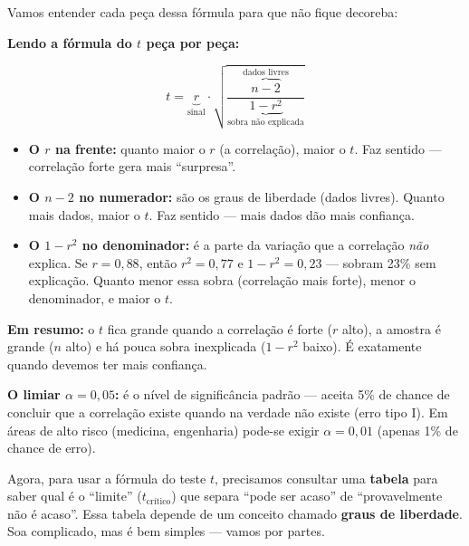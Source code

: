 Vamos entender cada peça dessa fórmula para que não fique decoreba:

\begin{SolvedBox}
\textbf{Lendo a fórmula do $t$ peça por peça:}

\[
t = \underbrace{r}_{\text{sinal}} \cdot
    \sqrt{\frac{\overbrace{n - 2}^{\text{dados livres}}}
               {\underbrace{1 - r^2}_{\text{sobra não explicada}}}}
\]

\begin{itemize}
  \item \textbf{O $r$ na frente:} quanto maior o $r$ (a correlação),
  maior o $t$. Faz sentido --- correlação forte gera mais ``surpresa''.
  \item \textbf{O $n - 2$ no numerador:} são os graus de liberdade
  (dados livres). Quanto mais dados, maior o $t$. Faz sentido ---
  mais dados dão mais confiança.
  \item \textbf{O $1 - r^2$ no denominador:} é a parte da variação que
  a correlação \emph{não} explica. Se $r = 0{,}88$, então $r^2 = 0{,}77$
  e $1 - r^2 = 0{,}23$ --- sobram 23\% sem explicação. Quanto menor
  essa sobra (correlação mais forte), menor o denominador, e maior o $t$.
\end{itemize}

\textbf{Em resumo:} o $t$ fica grande quando a correlação é forte ($r$
alto), a amostra é grande ($n$ alto) e há pouca sobra inexplicada
($1 - r^2$ baixo). É exatamente quando devemos ter mais confiança.
\end{SolvedBox}

\begin{NoteBox}
\textbf{O limiar $\alpha = 0{,}05$:} é o nível de significância padrão —
aceita 5\% de chance de concluir que a correlação existe quando na verdade
não existe (erro tipo I). Em áreas de alto risco (medicina, engenharia)
pode-se exigir $\alpha = 0{,}01$ (apenas 1\% de chance de erro).
\end{NoteBox}

Agora, para usar a fórmula do teste $t$, precisamos consultar uma
\textbf{tabela} para saber qual é o ``limite'' ($t_{\text{crítico}}$) que
separa ``pode ser acaso'' de ``provavelmente não é acaso''.
Essa tabela depende de um conceito chamado \textbf{graus de liberdade}.
Soa complicado, mas é bem simples — vamos por partes.

